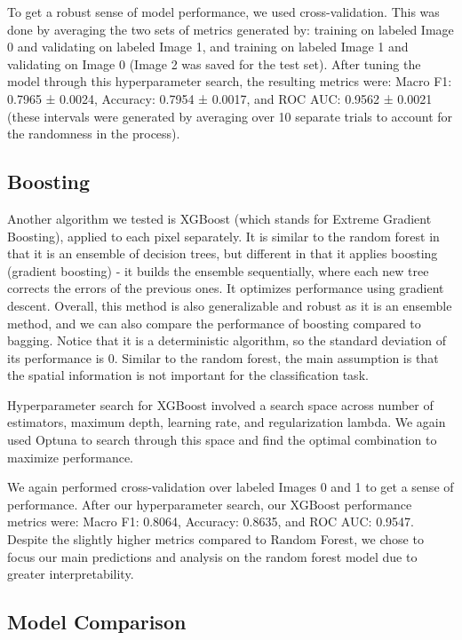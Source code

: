 \documentclass[10pt,letterpaper]{article}
\begin{document}
To get a robust sense of model performance, we used cross-validation. This was done by averaging the two sets of metrics generated by: training on labeled Image 0 and validating on labeled Image 1, and training on labeled Image 1 and validating on Image 0 (Image 2 was saved for the test set). After tuning the model through this hyperparameter search, the resulting metrics were: Macro F1: 0.7965 ± 0.0024, Accuracy: 0.7954 ± 0.0017, and ROC AUC: 0.9562 ± 0.0021 (these intervals were generated by averaging over 10 separate trials to account for the randomness in the process).


\subsection{Boosting}
Another algorithm we tested is XGBoost (which stands for Extreme Gradient Boosting), applied to each pixel separately. It is similar to the random forest in that it is an ensemble of decision trees, but different in that it applies boosting (gradient boosting) - it builds the ensemble sequentially, where each new tree corrects the errors of the previous ones. It optimizes performance using gradient descent. Overall, this method is also generalizable and robust as it is an ensemble method, and we can also compare the performance of boosting compared to bagging. Notice that it is a deterministic algorithm, so the standard deviation of its performance is 0. Similar to the random forest, the main assumption is that the spatial information is not important for the classification task.

Hyperparameter search for XGBoost involved a search space across number of estimators, maximum depth, learning rate, and regularization lambda. We again used Optuna to search through this space and find the optimal combination to maximize performance.

We again performed cross-validation over labeled Images 0 and 1 to get a sense of performance. After our hyperparameter search, our XGBoost performance metrics were: Macro F1: 0.8064, Accuracy: 0.8635, and ROC AUC: 0.9547. Despite the slightly higher metrics compared to Random Forest, we chose to focus our main predictions and analysis on the random forest model due to greater interpretability.


\subsection{Model Comparison}
\end{document}
